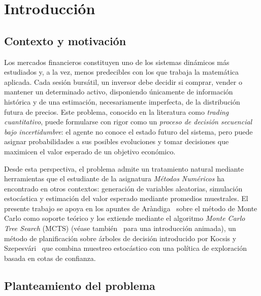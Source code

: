 \section{Introducción}
\label{sec:introduccion}

\subsection{Contexto y motivación}
\label{subsec:contexto}

Los mercados financieros constituyen uno de los sistemas dinámicos más estudiados y, a la vez, menos predecibles con los que trabaja la matemática aplicada. Cada sesión bursátil, un inversor debe decidir si comprar, vender o mantener un determinado activo, disponiendo únicamente de información histórica y de una estimación, necesariamente imperfecta, de la distribución futura de precios. Este problema, conocido en la literatura como \emph{trading cuantitativo}, puede formularse con rigor como un \emph{proceso de decisión secuencial bajo incertidumbre}: el agente no conoce el estado futuro del sistema, pero puede asignar probabilidades a sus posibles evoluciones y tomar decisiones que maximicen el valor esperado de un objetivo económico.

Desde esta perspectiva, el problema admite un tratamiento natural mediante herramientas que el estudiante de la asignatura \emph{Métodos Numéricos} ha encontrado en otros contextos: generación de variables aleatorias, simulación estocástica y estimación del valor esperado mediante promedios muestrales. El presente trabajo se apoya en los apuntes de Aràndiga~\cite{arandiga} sobre el método de Monte Carlo como soporte teórico y los extiende mediante el algoritmo \emph{Monte Carlo Tree Search} (MCTS) (véase también~\cite{kurbiel2024mcts} para una introducción animada), un método de planificación sobre árboles de decisión introducido por Kocsis y Szepesvári~\cite{kocsis2006} que combina muestreo estocástico con una política de exploración basada en cotas de confianza.

\subsection{Planteamiento del problema}
\label{subsec:problema}

